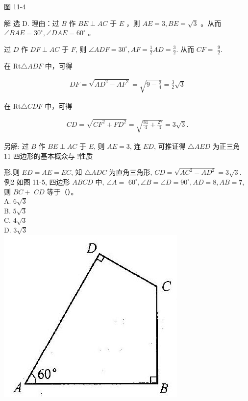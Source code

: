 \documentclass[10pt]{article}
\begin{document}
图 11-4

解 选 D. 理由：过 $B$ 作 $B E \perp A C$ 于 $E$ ，则 $A E=3, B E=\sqrt{3}$ 。从而 $\angle B A E=30^{\circ}, \angle D A E=60^{\circ}$ 。

过 $D$ 作 $D F \perp A C$ 于 $F$, 则 $\angle A D F=30^{\circ}, A F=\frac{1}{2} A D=\frac{3}{2}$. 从而 $C F=$ $\frac{9}{2}$.

在 $\mathrm{Rt} \triangle A D F$ 中，可得

\begin{align*}
D F=\sqrt{A D^{2}-A F^{2}}=\sqrt{9-\frac{9}{4}}=\frac{3}{2} \sqrt{3}
\end{align*}

在 $\mathrm{Rt} \triangle C D F$ 中，可得

\begin{align*}
C D=\sqrt{C F^{2}+F D^{2}}=\sqrt{\frac{81}{4}+\frac{27}{4}}=3 \sqrt{3} .
\end{align*}

另解: 过 $B$ 作 $B E \perp A C$ 于 $E$, 则 $A E=3$, 连 $E D$, 可推证得 $\triangle A E D$ 为正三角\\
11 四边形的基本概众与 !性质

形,则 $E D=A E=E C$, 知 $\triangle A D C$ 为直角三角形, $C D=\sqrt{A C^{2}-A D^{2}}=3 \sqrt{3}$.\\
例2 如图 11-5, 四边形 $A B C D$ 中, $\angle A=$ $60^{\circ}, \angle B=\angle D=90^{\circ}, A D=8, A B=7$, 则 $B C+$ $C D$ 等于（）。\\
A. $6 \sqrt{3}$\\
B. $5 \sqrt{3}$\\
C. $4 \sqrt{3}$\\
D. $3 \sqrt{3}$\\
\includegraphics[max width=\textwidth, center]{2024_10_30_2c8f45efd4a519b08e1ag-104}
\end{document}
